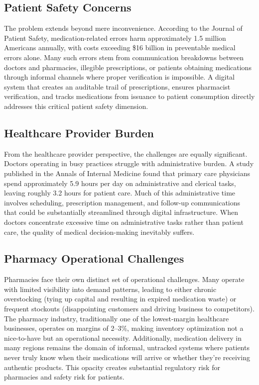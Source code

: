\documentclass[12pt,a4paper]{report}
\begin{document}
\subsection{Patient Safety Concerns}

The problem extends beyond mere inconvenience. According to the Journal of Patient Safety, medication-related errors harm approximately 1.5 million Americans annually, with costs exceeding \$16 billion in preventable medical errors alone. Many such errors stem from communication breakdowns between doctors and pharmacies, illegible prescriptions, or patients obtaining medications through informal channels where proper verification is impossible. A digital system that creates an auditable trail of prescriptions, ensures pharmacist verification, and tracks medications from issuance to patient consumption directly addresses this critical patient safety dimension.

\subsection{Healthcare Provider Burden}

From the healthcare provider perspective, the challenges are equally significant. Doctors operating in busy practices struggle with administrative burden. A study published in the Annals of Internal Medicine found that primary care physicians spend approximately 5.9 hours per day on administrative and clerical tasks, leaving roughly 3.2 hours for patient care. Much of this administrative time involves scheduling, prescription management, and follow-up communications that could be substantially streamlined through digital infrastructure. When doctors concentrate excessive time on administrative tasks rather than patient care, the quality of medical decision-making inevitably suffers.

\subsection{Pharmacy Operational Challenges}

Pharmacies face their own distinct set of operational challenges. Many operate with limited visibility into demand patterns, leading to either chronic overstocking (tying up capital and resulting in expired medication waste) or frequent stockouts (disappointing customers and driving business to competitors). The pharmacy industry, traditionally one of the lowest-margin healthcare businesses, operates on margins of 2--3\%, making inventory optimization not a nice-to-have but an operational necessity. Additionally, medication delivery in many regions remains the domain of informal, untracked systems where patients never truly know when their medications will arrive or whether they're receiving authentic products. This opacity creates substantial regulatory risk for pharmacies and safety risk for patients.
\end{document}
